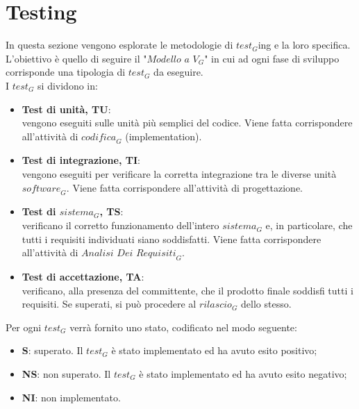 \section{Testing}
In questa sezione vengono esplorate le metodologie di $\textit{test}_G$ing e la loro specifica. L'obiettivo è quello di seguire il "$\textit{Modello a V}_G$" in cui ad ogni fase di sviluppo corrisponde una tipologia di $\textit{test}_G$ da eseguire.\\
I $\textit{test}_G$ si dividono in:
\begin{itemize}
    \item \textbf{Test di unità, TU}:\\
    vengono eseguiti sulle unità più semplici del codice. Viene fatta corrispondere all'attività di $\textit{codifica}_G$ (implementation).
    \item \textbf{Test di integrazione, TI}:\\
    vengono eseguiti per verificare la corretta integrazione tra le diverse unità $\textit{software}_G$. Viene fatta corrispondere all'attività di progettazione.
    \item \textbf{Test di $\textit{sistema}_G$, TS}:\\
    verificano il corretto funzionamento dell'intero $\textit{sistema}_G$ e, in particolare, che tutti i requisiti individuati siano soddisfatti. Viene fatta corrispondere all'attività di $\textit{Analisi Dei Requisiti}_G$. 
    \item \textbf{Test di accettazione, TA}:\\
    verificano, alla presenza del committente, che il prodotto finale soddisfi tutti i requisiti. Se superati, si può procedere al $\textit{rilascio}_G$ dello stesso.
\end{itemize}
Per ogni $\textit{test}_G$ verrà fornito uno stato, codificato nel modo seguente:
\begin{itemize}
    \item \textbf{S}: superato. Il $\textit{test}_G$ è stato implementato ed ha avuto esito positivo;
    \item \textbf{NS}: non superato. Il $\textit{test}_G$ è stato implementato ed ha avuto esito negativo;
    \item \textbf{NI}: non implementato.
\end{itemize}
